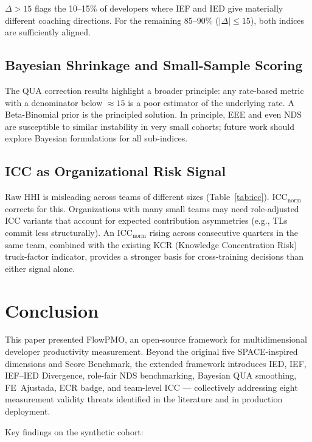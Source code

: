 \documentclass[conference]{IEEEtran}
\begin{document}
$\Delta > 15$ flags the 10--15\% of developers where IEF and IED give
materially different coaching directions. For the remaining 85--90\%
($|\Delta| \leq 15$), both indices are sufficiently aligned.

\subsection{Bayesian Shrinkage and Small-Sample Scoring}

The QUA correction results highlight a broader principle: any rate-based metric
with a denominator below $\approx 15$ is a poor estimator of the underlying rate.
A Beta-Binomial prior is the principled solution. In principle, EEE and even
NDS are susceptible to similar instability in very small cohorts; future work
should explore Bayesian formulations for all sub-indices.

\subsection{ICC as Organizational Risk Signal}

Raw HHI is misleading across teams of different sizes (Table~\ref{tab:icc}).
ICC$_\text{norm}$ corrects for this. Organizations with many small teams may need
role-adjusted ICC variants that account for expected contribution asymmetries
(e.g., TLs commit less structurally). An ICC$_\text{norm}$ rising across
consecutive quarters in the same team, combined with the existing KCR
(Knowledge Concentration Risk) truck-factor indicator, provides a stronger
basis for cross-training decisions than either signal alone.

\section{Conclusion}
\label{sec:conclusion}

This paper presented FlowPMO, an open-source framework for multidimensional
developer productivity measurement. Beyond the original five SPACE-inspired
dimensions and Score Benchmark, the extended framework introduces IED, IEF,
IEF--IED Divergence, role-fair NDS benchmarking, Bayesian QUA smoothing,
FE~Ajustada, ECR badge, and team-level ICC --- collectively addressing eight
measurement validity threats identified in the literature and in production
deployment.

Key findings on the synthetic cohort:
\end{document}
